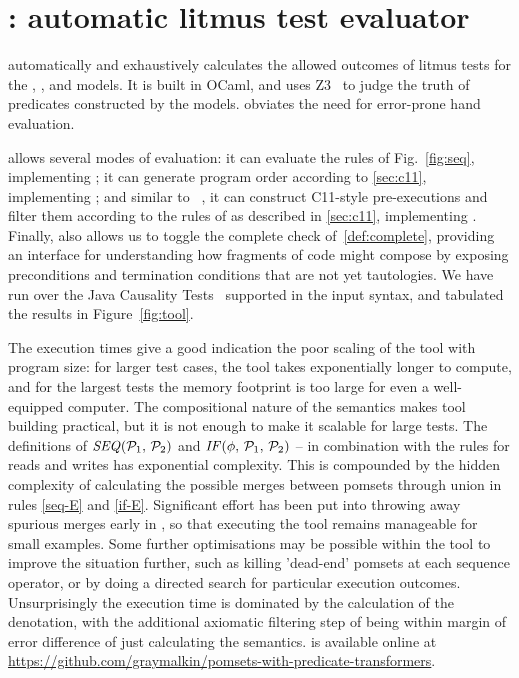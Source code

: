 \section{\PwTerTITLE: automatic litmus test evaluator}
\label{sec:tool}

\PwTer{} automatically and exhaustively calculates the allowed outcomes of litmus tests for the \PwT, \PwTpo, and \PwTc{} models. It is built in OCaml, and uses Z3~\cite{Z3Solver} to judge the truth of predicates constructed by the models. \PwTer{} obviates the need for error-prone hand evaluation.

\PwTer{} allows several modes of evaluation: it can evaluate the rules of Fig.~\ref{fig:seq}, implementing \PwT; it can generate program order according to \textsection\ref{sec:c11}, implementing \PwTpo; and similar to \MRD~\cite{DBLP:conf/esop/PaviottiCPWOB20}, it can construct C11-style pre-executions and filter them according to the rules of \rcXI{} as described in \textsection\ref{sec:c11}, implementing \PwTc{}.
Finally, \PwTer{} also allows us to toggle the complete check of~\ref{def:complete}, providing an interface for understanding how fragments of code might compose by exposing preconditions and termination conditions that are not yet tautologies.
We have run \PwTer{} over the Java Causality Tests~\cite{PughWebsite} supported in the input syntax, and tabulated the results in Figure~\ref{fig:tool}.

The execution times give a good indication the poor scaling of the tool with program size: for larger test cases, the tool takes exponentially longer to compute, and for the largest tests the memory footprint is too large for even a well-equipped computer.
The compositional nature of the semantics makes tool building practical, but it is not enough to make it scalable for large tests.
The definitions of $\sSEMI{\aPSS_1}{\aPSS_2}$ and $\sIF{\aForm}\sTHEN\aPSS_1\sELSE\aPSS_2\sFI$ -- in combination with the rules for reads and writes has exponential complexity.
This is compounded by the hidden complexity of calculating the possible merges between pomsets through union in rules \ref{seq-E} and \ref{if-E}.
Significant effort has been put into throwing away spurious merges early in \PwTer, so that executing the tool remains manageable for small examples.
Some further optimisations may be possible within the tool to improve the situation further, such as killing 'dead-end' pomsets at each sequence operator, or by doing a directed search for particular execution outcomes.
Unsurprisingly the execution time is dominated by the calculation of the denotation, with the additional axiomatic filtering step of \PwTc{} being within margin of error difference of just calculating the \PwT{} semantics. 
\PwTer{} is available online at \url{https://github.com/graymalkin/pomsets-with-predicate-transformers}.

